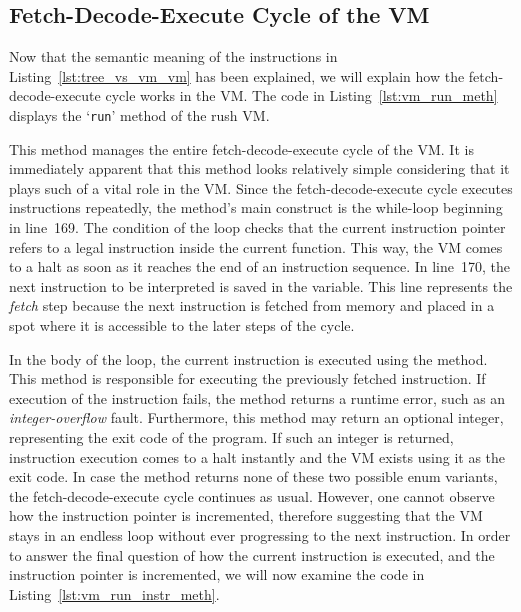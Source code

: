 \subsection{Fetch-Decode-Execute Cycle of the VM}
Now that the semantic meaning of the instructions in Listing~\ref{lst:tree_vs_vm_vm} has been explained, we will explain how the fetch-decode-execute cycle works in the VM\@.
The code in Listing~\ref{lst:vm_run_meth} displays the `\texttt{run}' method of the rush VM\@.


This method manages the entire fetch-decode-execute cycle of the VM\@.
It is immediately apparent that this method looks relatively simple considering that it plays such of a vital role in the VM\@.
Since the fetch-decode-execute cycle executes instructions repeatedly, the method's main construct is the while-loop beginning in line~169.
The condition of the loop checks that the current instruction pointer refers to a legal instruction inside the current function.
This way, the VM comes to a halt as soon as it reaches the end of an instruction sequence.
In line~170, the next instruction to be interpreted is saved in the  variable.
This line represents the \emph{fetch} step because the next instruction is fetched from memory and placed in a spot where it is accessible to the later steps of the cycle.

In the body of the loop, the current instruction is executed using the  method.
This method is responsible for executing the previously fetched instruction.
If execution of the instruction fails, the method returns a runtime error, such as an \emph{integer-overflow} fault.
Furthermore, this method may return an optional integer, representing the exit code of the program.
If such an integer is returned, instruction execution comes to a halt instantly and the VM exists using it as the exit code.
In case the method returns none of these two possible enum variants, the fetch-decode-execute cycle continues as usual.
However, one cannot observe how the instruction pointer is incremented, therefore suggesting that the VM stays in an endless loop without ever progressing to the next instruction.
In order to answer the final question of how the current instruction is executed, and the instruction pointer is incremented, we will now examine the code in Listing~\ref{lst:vm_run_instr_meth}.

